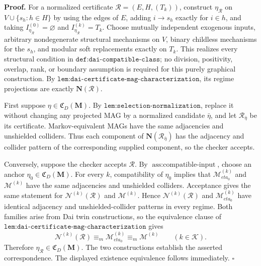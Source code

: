 \textbf{Proof.}
For a normalized certificate \(\mathcal R=(E,H,(T_k))\), construct \(\eta_{\mathcal R}\) on \(V\cup\{s_h:h\in H\}\) by using the edges of \(E\), adding \(i\to s_h\) exactly for \(i\in h\), and taking \(I_{\eta_{\mathcal R}}^{(0)}=\varnothing\) and \(I_{\eta_{\mathcal R}}^{(k)}=T_k\).  Choose mutually independent exogenous inputs, arbitrary nondegenerate structural mechanisms on \(V\), binary childless mechanisms for the \(s_h\), and modular soft replacements exactly on \(T_k\).  This realizes every structural condition in \(\texttt{def:dai-compatible-class}\); no division, positivity, overlap, rank, or boundary assumption is required for this purely graphical construction.  By \(\texttt{lem:dai-certificate-mag-characterization}\), its regime projections are exactly \(\mathbf N(\mathcal R)\).

First suppose \(\eta\in\mathfrak C_D(\mathbf M)\).  By \(\texttt{lem:selection-normalization}\), replace it without changing any projected MAG by a normalized candidate \(\bar\eta\), and let \(\mathcal R_{\bar\eta}\) be its certificate.  Markov-equivalent MAGs have the same adjacencies and unshielded colliders.  Thus each component of \(\mathbf N(\mathcal R_{\bar\eta})\) has the adjacency and collider pattern of the corresponding supplied component, so the checker accepts.

Conversely, suppose the checker accepts \(\mathcal R\).  By \(\operatorname{ass{:}compatible\text{-}input}\), choose an anchor \(\eta_0\in\mathfrak C_D(\mathbf M)\).  For every \(k\), compatibility of \(\eta_0\) implies that \(\mathcal M_{eta_0}^{(k)}\) and \(\mathcal M^{(k)}\) have the same adjacencies and unshielded colliders.  Acceptance gives the same statement for \(\mathcal N^{(k)}(\mathcal R)\) and \(\mathcal M^{(k)}\).  Hence \(\mathcal N^{(k)}(\mathcal R)\) and \(\mathcal M_{eta_0}^{(k)}\) have identical adjacency and unshielded-collider patterns in every regime.  Both families arise from Dai twin constructions, so the equivalence clause of \(\texttt{lem:dai-certificate-mag-characterization}\) gives
\[
\mathcal N^{(k)}(\mathcal R)\equiv_m\mathcal M_{eta_0}^{(k)}
\equiv_m\mathcal M^{(k)}
\qquad(k\in\mathcal K).
\]
Therefore \(\eta_{\mathcal R}\in\mathfrak C_D(\mathbf M)\).  The two constructions establish the asserted correspondence.  The displayed existence equivalence follows immediately. \(\square\)